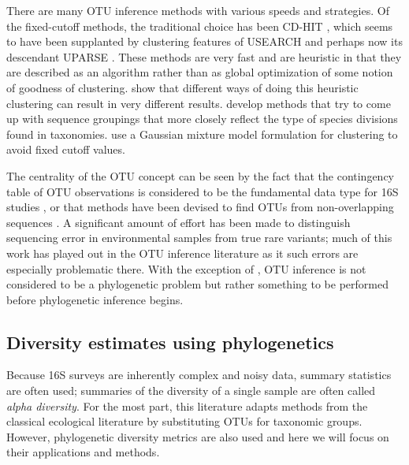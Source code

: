 \documentclass{amsart}
\begin{document}
There are many OTU inference methods with various speeds and strategies.
Of the fixed-cutoff methods, the traditional choice has been CD-HIT \citep{li2006cdhit}, which seems to have been supplanted by clustering features of USEARCH \citep{edgar2010usearch} and perhaps now its descendant UPARSE \citep{edgar2013uparse}.
These methods are very fast and are heuristic in that they are described as an algorithm rather than as global optimization of some notion of goodness of clustering.
\citet{white2010alignment} show that different ways of doing this heuristic clustering can result in very different results.
\citet{navlakha2009finding} develop methods that try to come up with sequence groupings that more closely reflect the type of species divisions found in taxonomies.
\citet{hao2011clustering} use a Gaussian mixture model formulation for clustering to avoid fixed cutoff values.

The centrality of the OTU concept can be seen by the fact that the contingency table of OTU observations is considered to be the fundamental data type for 16S studies \citep{mcdonald2012biological}, or that methods have been devised to find OTUs from non-overlapping sequences \citep{sharpton2011phylotu}.
A significant amount of effort has been made to distinguish sequencing error in environmental samples from true rare variants; much of this work has played out in the OTU inference literature \citep{quince2009accurate,quince2011removing,bragg2012fast,edgar2013uparse} as it such errors are especially problematic there.
With the exception of \citet{sharpton2011phylotu}, OTU inference is not considered to be a phylogenetic problem but rather something to be performed before phylogenetic inference begins.


\subsection{Diversity estimates using phylogenetics}
Because 16S surveys are inherently complex and noisy data, summary statistics are often used; summaries of the diversity of a single sample are often called \emph{alpha diversity}.
For the most part, this literature adapts methods from the classical ecological literature by substituting OTUs for taxonomic groups.
However, phylogenetic diversity metrics are also used and here we will focus on their applications and methods.
\end{document}
